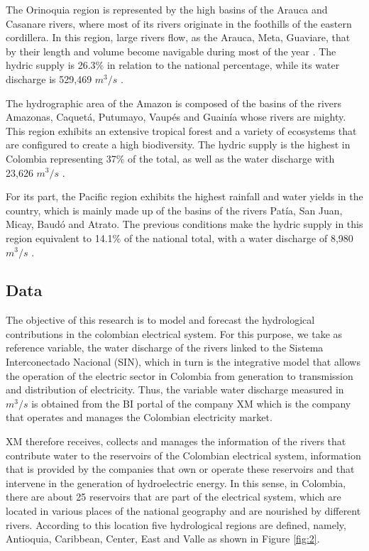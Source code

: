 \documentclass[12pt,halfline,a4paper]{ouparticle}
\begin{document}
The Orinoquia region is represented by the high basins of the Arauca and Casanare rivers, where most of its rivers originate in the foothills of the eastern cordillera. In this region, large rivers flow, as the Arauca, Meta, Guaviare, that by their length and volume become navigable during most of the year \citep{Garcia2010}. The hydric supply is 26.3$\%$ in relation to the national percentage, while its water discharge is 529,469 $m^{3}/s$ \citep{Santos2014}.

The hydrographic area of the Amazon is composed of the basins of the rivers Amazonas, Caquetá, Putumayo, Vaupés and Guainía whose rivers are mighty. This region exhibits an extensive tropical forest and a variety of ecosystems that are configured to create a high biodiversity. The hydric supply is the highest in Colombia representing 37$\%$ of the total, as well as the water discharge with 23,626 $m^{3}/s$ \citep{Santos2014}.

For its part, the Pacific region exhibits the highest rainfall and water yields in the country, which is mainly made up of the basins of the rivers Patía, San Juan, Micay, Baudó and Atrato. The previous conditions make the hydric supply in this region equivalent to 14.1$\%$ of the national total, with a water discharge of 8,980 $m^{3}/s$ \citep{Santos2014}.

\subsection{Data}

The objective of this research is to model and forecast the hydrological contributions in the colombian electrical system. For this purpose, we take as reference variable, the water discharge of the rivers linked to the Sistema Interconectado Nacional (SIN), which in turn is the integrative model that allows the operation of the electric sector in Colombia from generation to transmission and distribution of electricity. Thus, the variable water discharge measured in $m^{3}/s$ is obtained from the BI portal of the company XM which is the company that operates and manages the Colombian electricity market. 

XM therefore receives, collects and manages the information of the rivers that contribute water to the reservoirs of the Colombian electrical system, information that is provided by the companies that own or operate these reservoirs and that intervene in the generation of hydroelectric energy. In this sense, in Colombia, there are about 25 reservoirs that are part of the electrical system, which are located in various places of the national geography and are nourished by different rivers. According to this location five hydrological regions are defined, namely, Antioquia, Caribbean, Center, East and Valle as shown in Figure \ref{fig:2}.
\end{document}
